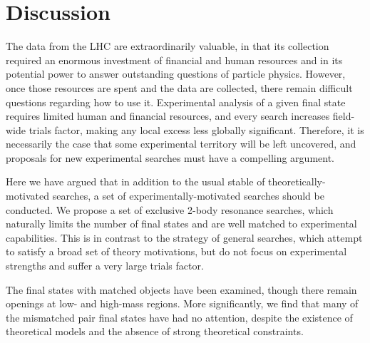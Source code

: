 \section{Discussion}

The data from the LHC are extraordinarily valuable, in that its collection required an enormous investment of financial and human resources and in its potential power to answer outstanding questions of particle physics.  However, once those resources are spent and the data are collected, there remain difficult questions regarding how to use it. Experimental analysis of a given final state requires limited human and financial resources, and every search increases field-wide trials factor, making any local excess less globally significant.  Therefore, it is necessarily the case that some experimental territory will be left uncovered, and proposals for new experimental searches must have a  compelling argument.

Here we have argued that in addition to the usual stable of theoretically-motivated searches, a set of experimentally-motivated searches should be conducted.  We propose a set of exclusive 2-body resonance searches, which naturally limits the number of final states and are well matched to experimental capabilities. This is in contrast to the strategy of general searches, which attempt to satisfy a broad set of theory motivations, but do not focus on experimental strengths and suffer a very large trials factor.

The final states with matched objects have been examined, though there remain openings at low- and high-mass regions. More significantly, we find that many of the mismatched pair final states have had no attention, despite the existence of theoretical models and the absence of strong theoretical constraints. \\


